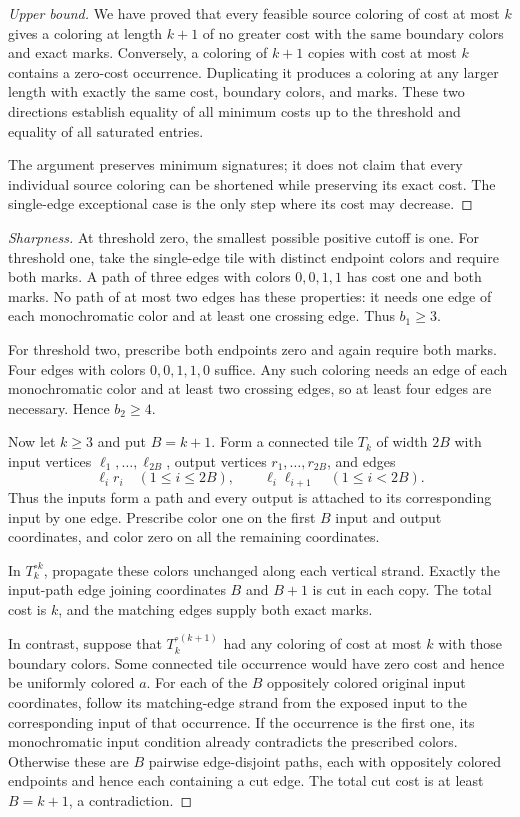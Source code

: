\begin{proof}[Upper bound]
We have proved that every feasible source coloring of cost at most $k$
gives a coloring at length $k+1$ of no greater cost with the same boundary
colors and exact marks.  Conversely, a coloring of $k+1$ copies with cost
at most $k$ contains a zero-cost occurrence.  Duplicating it produces a
coloring at any larger length with exactly the same cost, boundary colors,
and marks.  These two directions establish equality of all minimum costs
up to the threshold and equality of all saturated entries.

The argument preserves minimum signatures; it does not claim that every
individual source coloring can be shortened while preserving its exact cost.
The single-edge exceptional case is the only step where its cost may decrease.
\end{proof}

\begin{proof}[Sharpness]
At threshold zero, the smallest possible positive cutoff is one.
For threshold one, take the single-edge tile with distinct endpoint colors
and require both marks.  A path of three edges with colors $0,0,1,1$ has
cost one and both marks.  No path of at most two edges has these properties:
it needs one edge of each monochromatic color and at least one crossing edge.
Thus $b_1\geq3$.

For threshold two, prescribe both endpoints zero and again require both
marks.  Four edges with colors $0,0,1,1,0$ suffice.  Any such coloring needs
an edge of each monochromatic color and at least two crossing edges, so at
least four edges are necessary.  Hence $b_2\geq4$.

Now let $k\geq3$ and put $B=k+1$.  Form a connected tile $T_k$ of width
$2B$ with input vertices $\ell_1,\ldots,\ell_{2B}$, output vertices
$r_1,\ldots,r_{2B}$, and edges
\[
 \ell_i r_i \quad(1\leq i\leq2B),
 \qquad
 \ell_i\ell_{i+1}\quad(1\leq i<2B).
\]
Thus the inputs form a path and every output is attached to its corresponding
input by one edge.  Prescribe color one on the first $B$ input and output
coordinates, and color zero on all the remaining coordinates.

In $T_k^{\circ k}$, propagate these colors unchanged along each vertical
strand.  Exactly the input-path edge joining coordinates $B$ and $B+1$
is cut in each copy.  The total cost is $k$, and the matching edges supply
both exact marks.

In contrast, suppose that $T_k^{\circ(k+1)}$ had any coloring of cost at
most $k$ with those boundary colors.  Some connected tile occurrence would
have zero cost and hence be uniformly colored $a$.  For each of the $B$
oppositely colored original input coordinates, follow its matching-edge
strand from the exposed input to the corresponding input of that occurrence.
If the occurrence is the first one, its monochromatic input condition already
contradicts the prescribed colors.  Otherwise these are $B$ pairwise
edge-disjoint paths, each with oppositely colored endpoints and hence each
containing a cut edge.  The total cut cost is at least $B=k+1$, a contradiction.


\end{proof}
